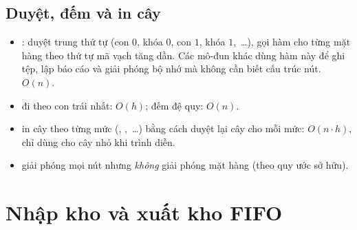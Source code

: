 \subsection{Duyệt, đếm và in cây}

\begin{itemize}
  \item {}: duyệt trung thứ tự (con $0$, khóa $0$, con $1$, khóa $1$,~\ldots), gọi hàm
         cho từng mặt hàng theo thứ tự mã vạch tăng dần. Các mô-đun khác dùng hàm này để
        ghi tệp, lập báo cáo và giải phóng bộ nhớ mà không cần biết cấu trúc nút. $O(n)$.
  \item {} đi theo con trái nhất: $O(h)$;  đếm đệ quy: $O(n)$.
  \item {} in cây theo từng mức (, ,~\ldots) bằng cách duyệt lại cây cho
        mỗi mức: $O(n\cdot h)$, chỉ dùng cho cây nhỏ khi trình diễn.
  \item {} giải phóng mọi nút nhưng \emph{không} giải phóng mặt hàng (theo quy ước sở hữu).
\end{itemize}

\section{Nhập kho và xuất kho FIFO}

